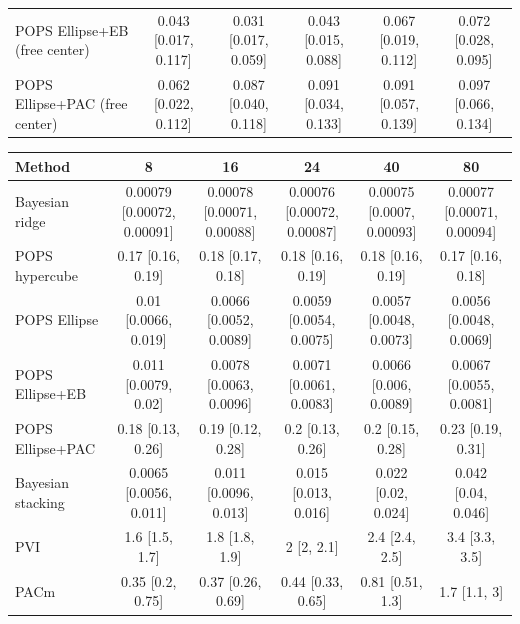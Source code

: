 \begin{tabular}{lccccc}
POPS Ellipse+EB (free center) & 0.043 {\scriptsize[0.017, 0.117]} & 0.031 {\scriptsize[0.017, 0.059]} & 0.043 {\scriptsize[0.015, 0.088]} & 0.067 {\scriptsize[0.019, 0.112]} & 0.072 {\scriptsize[0.028, 0.095]} \\
POPS Ellipse+PAC (free center) & 0.062 {\scriptsize[0.022, 0.112]} & 0.087 {\scriptsize[0.040, 0.118]} & 0.091 {\scriptsize[0.034, 0.133]} & 0.091 {\scriptsize[0.057, 0.139]} & 0.097 {\scriptsize[0.066, 0.134]} \\
\bottomrule
\end{tabular}

\begin{tabular}{lccccc}
\toprule
Method & 8 & 16 & 24 & 40 & 80 \\
\midrule
Bayesian ridge & 0.00079 {\scriptsize[0.00072, 0.00091]} & 0.00078 {\scriptsize[0.00071, 0.00088]} & 0.00076 {\scriptsize[0.00072, 0.00087]} & 0.00075 {\scriptsize[0.0007, 0.00093]} & 0.00077 {\scriptsize[0.00071, 0.00094]} \\
POPS hypercube & 0.17 {\scriptsize[0.16, 0.19]} & 0.18 {\scriptsize[0.17, 0.18]} & 0.18 {\scriptsize[0.16, 0.19]} & 0.18 {\scriptsize[0.16, 0.19]} & 0.17 {\scriptsize[0.16, 0.18]} \\
POPS Ellipse & 0.01 {\scriptsize[0.0066, 0.019]} & 0.0066 {\scriptsize[0.0052, 0.0089]} & 0.0059 {\scriptsize[0.0054, 0.0075]} & 0.0057 {\scriptsize[0.0048, 0.0073]} & 0.0056 {\scriptsize[0.0048, 0.0069]} \\
POPS Ellipse+EB & 0.011 {\scriptsize[0.0079, 0.02]} & 0.0078 {\scriptsize[0.0063, 0.0096]} & 0.0071 {\scriptsize[0.0061, 0.0083]} & 0.0066 {\scriptsize[0.006, 0.0089]} & 0.0067 {\scriptsize[0.0055, 0.0081]} \\
POPS Ellipse+PAC & 0.18 {\scriptsize[0.13, 0.26]} & 0.19 {\scriptsize[0.12, 0.28]} & 0.2 {\scriptsize[0.13, 0.26]} & 0.2 {\scriptsize[0.15, 0.28]} & 0.23 {\scriptsize[0.19, 0.31]} \\
Bayesian stacking & 0.0065 {\scriptsize[0.0056, 0.011]} & 0.011 {\scriptsize[0.0096, 0.013]} & 0.015 {\scriptsize[0.013, 0.016]} & 0.022 {\scriptsize[0.02, 0.024]} & 0.042 {\scriptsize[0.04, 0.046]} \\
PVI & 1.6 {\scriptsize[1.5, 1.7]} & 1.8 {\scriptsize[1.8, 1.9]} & 2 {\scriptsize[2, 2.1]} & 2.4 {\scriptsize[2.4, 2.5]} & 3.4 {\scriptsize[3.3, 3.5]} \\
PACm & 0.35 {\scriptsize[0.2, 0.75]} & 0.37 {\scriptsize[0.26, 0.69]} & 0.44 {\scriptsize[0.33, 0.65]} & 0.81 {\scriptsize[0.51, 1.3]} & 1.7 {\scriptsize[1.1, 3]} \\

\end{tabular}
